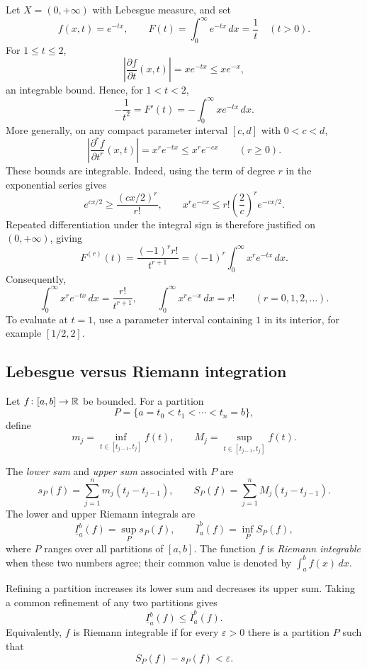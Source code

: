 \begin{example}
  Let $X=(0,+\infty)$ with Lebesgue measure, and set
  \[
    f(x,t)=e^{-tx},\qquad
    F(t)=\int_0^{\infty}e^{-tx}\,dx=\frac1t\quad(t>0).
  \]
  For $1\leq t\leq2$,
  \[
    \left|\frac{\partial f}{\partial t}(x,t)\right|
      =xe^{-tx}\leq xe^{-x},
  \]
  an integrable bound. Hence, for $1<t<2$,
  \[
    -\frac1{t^2}=F'(t)=-\int_0^{\infty}xe^{-tx}\,dx.
  \]
  More generally, on any compact parameter interval $[c,d]$
  with $0<c<d$,
  \[
    \left|\frac{\partial^r f}{\partial t^r}(x,t)\right|
      =x^r e^{-tx}\leq x^r e^{-cx}\qquad(r\geq0).
  \]
  These bounds are integrable. Indeed, using the term of degree $r$
  in the exponential series gives
  \[
    e^{cx/2}\geq\frac{(cx/2)^r}{r!},\qquad
    x^r e^{-cx}\leq r!\left(\frac2c\right)^r e^{-cx/2}.
  \]
  Repeated differentiation under the integral sign is therefore
  justified on $(0,+\infty)$, giving
  \[
    F^{(r)}(t)
      =\frac{(-1)^r r!}{t^{r+1}}
      =(-1)^r\int_0^{\infty}x^r e^{-tx}\,dx.
  \]
  Consequently,
  \[
    \int_0^{\infty}x^r e^{-tx}\,dx=\frac{r!}{t^{r+1}},
    \qquad
    \int_0^{\infty}x^r e^{-x}\,dx=r!
    \qquad(r=0,1,2,\ldots).
  \]
  To evaluate at $t=1$, use a parameter interval containing $1$ in
  its interior, for example $[1/2,2]$.
\end{example}

\subsection{Lebesgue versus Riemann integration}

Let $f\colon[a,b]\to\mathbb{R}$ be bounded. For a partition
\[
  P=\{a=t_0<t_1<\cdots<t_n=b\},
\]
define
\[
  m_j=\inf_{t\in[t_{j-1},t_j]}f(t),\qquad
  M_j=\sup_{t\in[t_{j-1},t_j]}f(t).
\]

\begin{definition}
  The \emph{lower sum} and \emph{upper sum} associated with $P$ are
  \[
    s_P(f)=\sum_{j=1}^n m_j(t_j-t_{j-1}),\qquad
    S_P(f)=\sum_{j=1}^n M_j(t_j-t_{j-1}).
  \]
  The lower and upper Riemann integrals are
  \[
    \underline I_a^b(f)=\sup_P s_P(f),\qquad
    \overline I_a^b(f)=\inf_P S_P(f),
  \]
  where $P$ ranges over all partitions of $[a,b]$. The function $f$
  is \emph{Riemann integrable} when these two numbers agree; their
  common value is denoted by $\int_a^b f(x)\,dx$.
\end{definition}

Refining a partition increases its lower sum and decreases its upper
sum. Taking a common refinement of any two partitions gives
\[
  \underline I_a^b(f)\leq\overline I_a^b(f).
\]
Equivalently, $f$ is Riemann integrable if for every $\varepsilon>0$
there is a partition $P$ such that
\[
  S_P(f)-s_P(f)<\varepsilon.
\]

